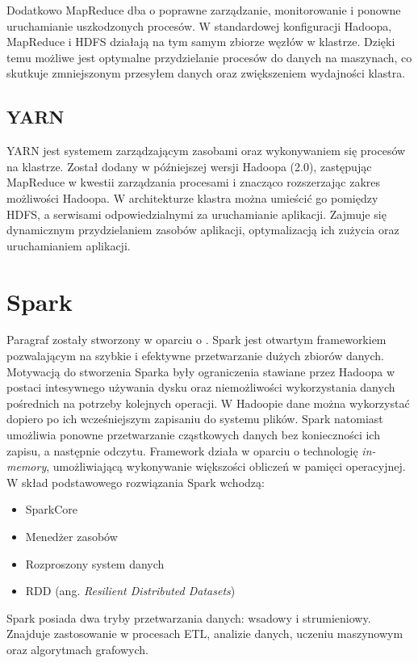 \documentclass[licencjacka]{pracamgr}
\begin{document}
Dodatkowo MapReduce dba o poprawne zarządzanie, monitorowanie i ponowne uruchamianie uszkodzonych procesów. W standardowej konfiguracji Hadoopa, MapReduce i HDFS działają na tym samym zbiorze węzłów w klastrze. Dzięki temu możliwe jest optymalne przydzielanie procesów do danych na maszynach, co skutkuje zmniejszonym przesyłem danych oraz zwiększeniem wydajności klastra.

\subsection{YARN}

YARN jest systemem zarządzającym zasobami oraz wykonywaniem się procesów na klastrze. Został dodany w późniejszej wersji Hadoopa (2.0), zastępując MapReduce w kwestii zarządzania procesami i znacząco rozszerzając zakres możliwości Hadoopa. W architekturze klastra można umieścić go pomiędzy HDFS, a serwisami odpowiedzialnymi za uruchamianie aplikacji. Zajmuje się dynamicznym przydzielaniem zasobów aplikacji, optymalizacją ich zużycia oraz uruchamianiem aplikacji.

\section{Spark}

Paragraf zostały stworzony w oparciu o \cite{zaharia2010spark}. Spark jest otwartym frameworkiem pozwalającym na szybkie i efektywne przetwarzanie dużych zbiorów danych. Motywacją do stworzenia Sparka były ograniczenia stawiane przez Hadoopa w postaci intesywnego używania dysku oraz niemożliwości wykorzystania danych pośrednich na potrzeby kolejnych operacji. W Hadoopie dane można wykorzystać dopiero po ich wcześniejszym zapisaniu do systemu plików. Spark natomiast umożliwia ponowne przetwarzanie cząstkowych danych bez konieczności ich zapisu, a następnie odczytu. Framework działa w oparciu o technologię \textit{in-memory}, umożliwiającą wykonywanie większości obliczeń w pamięci operacyjnej. W skład podstawowego rozwiązania Spark wchodzą:
\begin{itemize}
    \item SparkCore
    \item Menedżer zasobów
    \item Rozproszony system danych
    \item RDD (ang. \textit{Resilient Distributed Datasets})
\end{itemize}

Spark posiada dwa tryby przetwarzania danych: wsadowy i strumieniowy. Znajduje zastosowanie w procesach ETL, analizie danych, uczeniu maszynowym oraz algorytmach grafowych.
\end{document}
